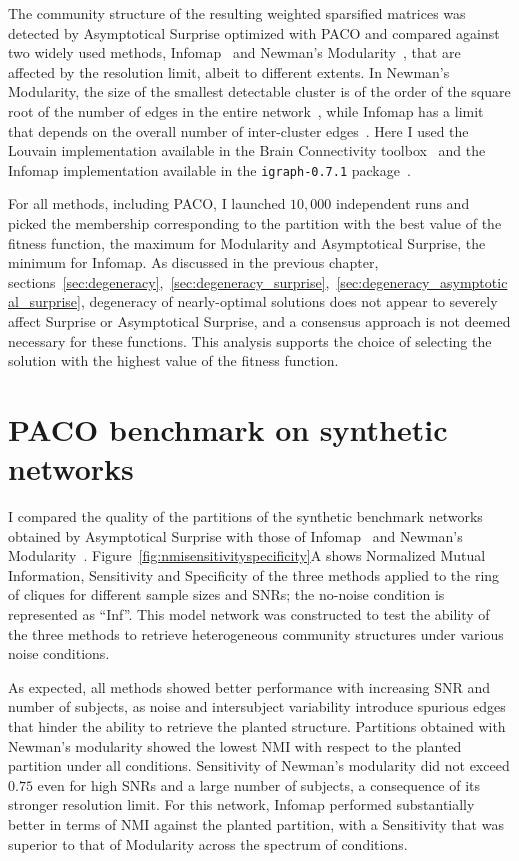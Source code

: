 The community structure of the resulting weighted sparsified matrices was detected by Asymptotical Surprise optimized with PACO and compared against two widely used methods, Infomap~\cite{rosvall2008} and Newman's Modularity~\cite{blondel2008,newman2006}, that are affected by the resolution limit, albeit to different extents.
In Newman's Modularity, the size of the smallest detectable cluster is of the order of the square root of the number of edges in the entire network~\cite{fortunato2007}, while Infomap has a limit that depends on the overall number of inter-cluster edges~\cite{kawamoto2015}.
Here I used the Louvain implementation available in the Brain Connectivity toolbox~\cite{rubinov2010} and the Infomap implementation available in the \texttt{igraph-0.7.1} package~\cite{igraph2006}.

For all methods, including PACO, I launched $10,000$ independent runs and picked the membership corresponding to the partition with the best value of the fitness function, the maximum for Modularity and Asymptotical Surprise, the minimum for Infomap.
As discussed in the previous chapter, sections~\ref{sec:degeneracy},~\ref{sec:degeneracy_surprise},~\ref{sec:degeneracy_asymptotical_surprise}, degeneracy of nearly-optimal solutions does not appear to severely affect Surprise or Asymptotical Surprise, and a consensus approach is not deemed necessary for these functions.
This analysis supports the choice of selecting the solution with the highest value of the fitness function.

\section{PACO benchmark on synthetic networks}
I compared the quality of the partitions of the synthetic benchmark networks obtained by Asymptotical Surprise with those of Infomap~\cite{rosvall2008} and Newman's Modularity~\cite{newman2006,blondel2008}.
Figure~\ref{fig:nmisensitivityspecificity}A shows Normalized Mutual Information, Sensitivity and Specificity of the three methods applied to the ring of cliques for different sample sizes and SNRs; the no-noise condition is represented as ``Inf''.
This model network was constructed to test the ability of the three methods to retrieve heterogeneous community structures under various noise conditions.

As expected, all methods showed better performance with increasing SNR and number of subjects, as noise and intersubject variability introduce spurious edges that hinder the ability to retrieve the planted structure.
Partitions obtained with Newman's modularity showed the lowest NMI with respect to the planted partition under all conditions.
Sensitivity of Newman's modularity did not exceed $0.75$ even for high SNRs and a large number of subjects, a consequence of its stronger resolution limit.
For this network, Infomap performed substantially better in terms of NMI against the planted partition, with a Sensitivity that was superior to that of Modularity across the spectrum of conditions.

